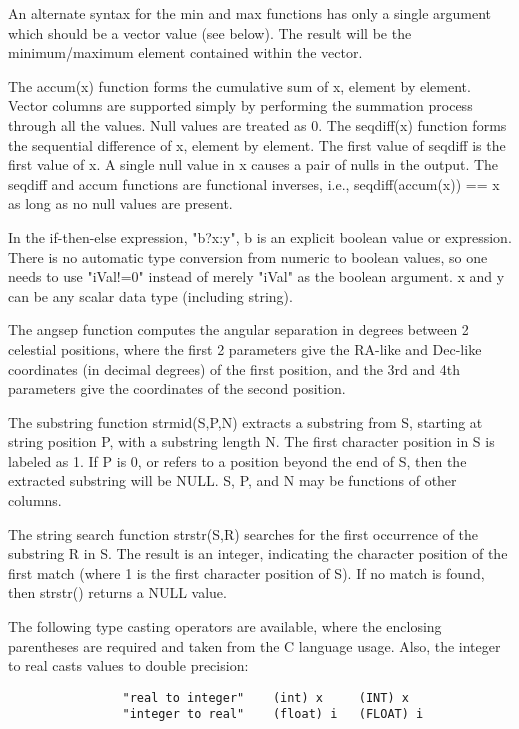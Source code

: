 \documentclass[11pt]{book}
\begin{document}
An alternate syntax for the min and max functions  has only a single
argument which  should be  a  vector value (see  below).  The result
will be the minimum/maximum element contained within the vector.

The accum(x) function forms the cumulative sum of x, element by
element.  Vector columns are supported simply by performing the
summation process through all the values.  Null values are treated as
0.  The seqdiff(x) function forms the sequential difference of x,
element by element.  The first value of seqdiff is the first value of
x.  A single null value in x causes a pair of nulls in the output.
The seqdiff and accum functions are functional inverses, i.e.,
seqdiff(accum(x)) == x as long as no null values are present.

In the if-then-else expression, "b?x:y", b is an explicit boolean
value or expression.  There is no automatic type conversion from
numeric to boolean values, so one needs to use "iVal!=0" instead of
merely "iVal" as the boolean argument. x and y can be any scalar data
type (including string).

The angsep function computes the angular separation in degrees between
2 celestial positions, where the first 2 parameters give the RA-like
and Dec-like coordinates (in decimal degrees) of the first position,
and the 3rd and 4th parameters give the coordinates of the second
position.

The substring function strmid(S,P,N) extracts a substring from S,
starting at string position P, with a substring length N.  The first
character position in S is labeled as 1. If P is 0, or refers to a
position beyond the end of S, then the extracted substring will be
NULL.  S, P, and N may be functions of other columns.

The string search function strstr(S,R) searches for the first
occurrence of the substring R in S.  The result is an integer,
indicating the character position of the first match (where 1 is the
first character position of S).  If no match is found, then strstr()
returns a NULL value.

The following type casting operators are available, where the
enclosing parentheses are required and taken from the C language
usage. Also, the integer to real casts values to double precision:

\begin{verbatim}
                "real to integer"    (int) x     (INT) x
                "integer to real"    (float) i   (FLOAT) i
\end{verbatim}
\end{document}

